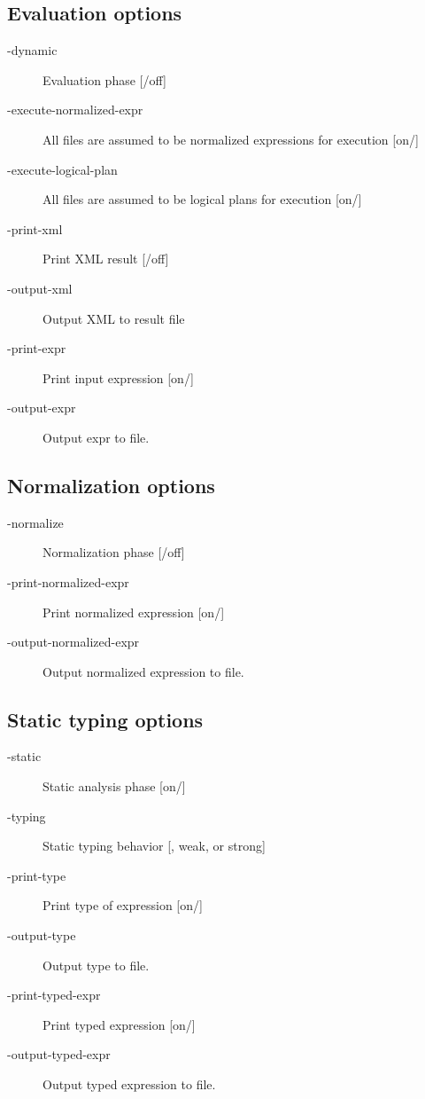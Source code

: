 \subsection{Evaluation options}
\begin{description}
\item[-dynamic]  Evaluation phase [/off]

\item[-execute-normalized-expr]  All files are assumed to be normalized expressions for execution [{on}/]
\item[-execute-logical-plan]  All files are assumed to be logical plans for execution [{on}/]

\item[-print-xml]  Print XML result [/off]
\item[-output-xml]  Output XML to result file

\item[-print-expr]  Print input expression [on/]
\item[-output-expr]  Output expr to file.

\end{description}

\subsection{Normalization options}
\begin{description}
\item[-normalize]  Normalization phase [/off]
\item[-print-normalized-expr]  Print normalized expression [on/]
\item[-output-normalized-expr]  Output normalized expression to file.
\end{description}

\subsection{Static typing options}
\begin{description}
\item[-static] Static analysis phase [on/]
\item[-typing] Static typing behavior [, weak, or strong]

\item[-print-type]  Print type of expression [on/]
\item[-output-type]  Output type to file.

\item[-print-typed-expr]  Print typed expression [on/]
\item[-output-typed-expr]  Output typed expression to file.
\end{description}

